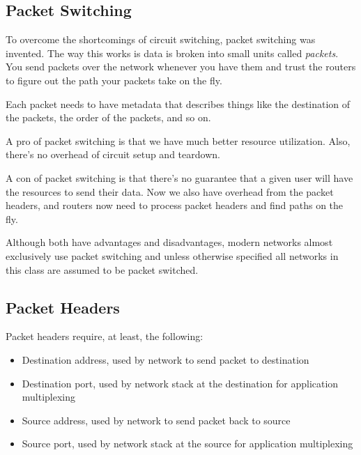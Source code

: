 \subsection{Packet Switching}
To overcome the shortcomings of circuit switching, packet switching was invented.
The way this works is data is broken into small units called \emph{packets}.
You send packets over the network whenever you have them and trust the routers
to figure out the path your packets take on the fly.

Each packet needs to have metadata that describes things like the destination
of the packets, the order of the packets, and so on.

A pro of packet switching is that we have much better resource utilization.
Also, there's no overhead of circuit setup and teardown.

A con of packet switching is that there's no guarantee that a given user
will have the resources to send their data. Now we also have overhead from
the packet headers, and routers now need to process packet headers and find paths
on the fly.

Although both have advantages and disadvantages, modern networks almost
exclusively use packet switching and unless otherwise specified all
networks in this class are assumed to be packet switched.

\subsection{Packet Headers}
Packet headers require, at least, the following:
\begin{itemize}
    \item Destination address, used by network to send packet to destination
    \item Destination port, used by network stack at the destination for
          application multiplexing
    \item Source address, used by network to send packet back to source
    \item Source port, used by network stack at the source for application
          multiplexing
\end{itemize}